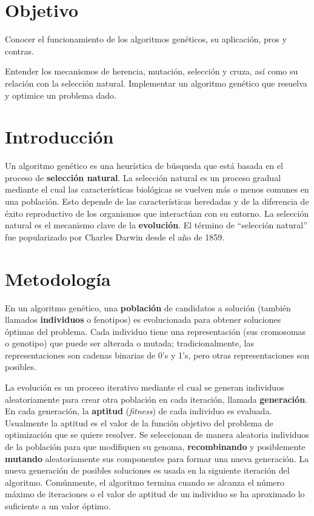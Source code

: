 

\section{Objetivo}
Conocer el funcionamiento de los algoritmos genéticos, su aplicación, pros y contras.\par
Entender los mecanismos de herencia, mutación, selección y cruza, así como su relación con la selección natural.
Implementar un algoritmo genético que resuelva y optimice un problema dado.

\section{Introducci\'on}

Un algoritmo genético es una heurística de búsqueda que está basada en el proceso de \textbf{selección natural}. La selección natural es un proceso gradual mediante el cual las características biológicas se vuelven más o menos comunes en una población. Esto depende de las características heredadas y de la diferencia de éxito reproductivo de los organismos que interactúan con su entorno. La selección natural es el mecanismo clave de la \textbf{evolución}. El término de “selección natural” fue popularizado por Charles Darwin desde el año de 1859.

\section{Metodolog\'ia}

En un algoritmo genético, una \textbf{población} de candidatos a solución (también llamados \textbf{individuos} o fenotipos) es evolucionada para obtener soluciones óptimas del problema. Cada individuo tiene una representación (sus cromosomas o genotipo) que puede ser alterada o mutada; tradicionalmente, las representaciones son cadenas binarias de 0’s y 1’s, pero otras representaciones son posibles.\par

La evolución es un proceso iterativo mediante el cual se generan individuos aleatoriamente para crear otra población en cada iteración, llamada \textbf{generación}. En cada generación, la \textbf{aptitud} (\textit{fitness}) de cada individuo es evaluada. Usualmente la aptitud es el valor de la función objetivo del problema de optimización que se quiere resolver. Se seleccionan de manera aleatoria individuos de la población para que modifiquen su genoma, \textbf{recombinando} y posiblemente \textbf{mutando} aleatoriamente sus componentes para formar una nueva generación. La nueva generación de posibles soluciones es usada en la siguiente iteración del algoritmo. Comúnmente, el algoritmo termina cuando se alcanza el número máximo de iteraciones o el valor de aptitud de un individuo se ha aproximado lo suficiente a un valor óptimo.

